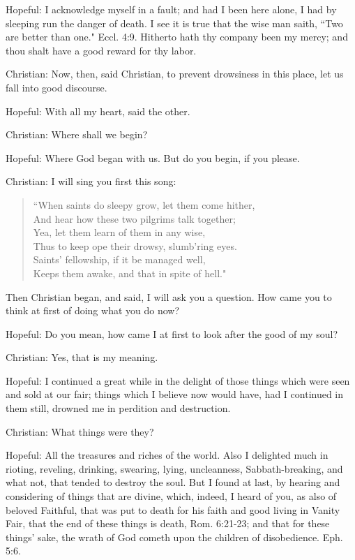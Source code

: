 Hopeful: I acknowledge myself in a fault; and had I been here alone, I had by sleeping run the danger of death. I see it is true that the wise man saith, ``Two are better than one." Eccl. 4:9. Hitherto hath thy company been my mercy; and thou shalt have a good reward for thy labor.

Christian: Now, then, said Christian, to prevent drowsiness in this place, let us fall into good discourse.

Hopeful: With all my heart, said the other.

Christian: Where shall we begin?

Hopeful: Where God began with us. But do you begin, if you please.

Christian: I will sing you first this song:
\begin{verse}
``When saints do sleepy grow, let them come hither,\\
And hear how these two pilgrims talk together;\\
Yea, let them learn of them in any wise,\\
Thus to keep ope their drowsy, slumb'ring eyes.\\
Saints' fellowship, if it be managed well,\\
Keeps them awake, and that in spite of hell."\\
\end{verse}
Then Christian began, and said, I will ask you a question. How came you to think at first of doing what you do now?

Hopeful: Do you mean, how came I at first to look after the good of my soul?

Christian: Yes, that is my meaning.

Hopeful: I continued a great while in the delight of those things which were seen and sold at our fair; things which I believe now would have, had I continued in them still, drowned me in perdition and destruction.

Christian: What things were they?

Hopeful: All the treasures and riches of the world. Also I delighted much in rioting, reveling, drinking, swearing, lying, uncleanness, Sabbath-breaking, and what not, that tended to destroy the soul. But I found at last, by hearing and considering of things that are divine, which, indeed, I heard of you, as also of beloved Faithful, that was put to death for his faith and good living in Vanity Fair, that the end of these things is death, Rom. 6:21-23; and that for these things' sake, the wrath of God cometh upon the children of disobedience. Eph. 5:6.

